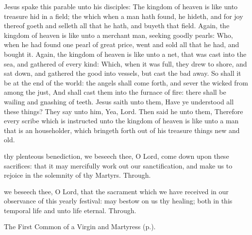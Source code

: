  Jesus spake this parable unto his disciples: The kingdom of heaven is like unto treasure hid in a field; the which when a man hath found, he hideth, and for joy thereof goeth and selleth all that he hath, and buyeth that field. Again, the kingdom of heaven is like unto a merchant man, seeking goodly pearls: Who, when he had found one pearl of great price, went and sold all that he had, and bought it. Again, the kingdom of heaven is like unto a net, that was cast into the sea, and gathered of every kind: Which, when it was full, they drew to shore, and sat down, and gathered the good into vessels, but cast the bad away. So shall it be at the end of the world: the angels shall come forth, and sever the wicked from among the just, And shall cast them into the furnace of fire: there shall be wailing and gnashing of teeth. Jesus saith unto them, Have ye understood all these things? They say unto him, Yea, Lord. Then said he unto them, Therefore every scribe which is instructed unto the kingdom of heaven is like unto a man that is an householder, which bringeth forth out of his treasure things new and old.


\secret\label{AgnesSecretII}
 thy plenteous benediction, we beseech thee, O Lord, come down upon these sacrifices: that it may mercifully work out our sanctification, and make us to rejoice in the solemnity of thy Martyrs. Through.


\postcommunion\label{AgnesPostcommunionII}
 we beseech thee, O Lord, that the sacrament which we have received in our observance of this yearly festival: may bestow on us thy healing; both in this temporal life and unto life eternal. Through.



\begin{rubric}
	The First Common of a Virgin and Martyress (p.\pageref{CommonVirginMartyrI}).
\end{rubric}



